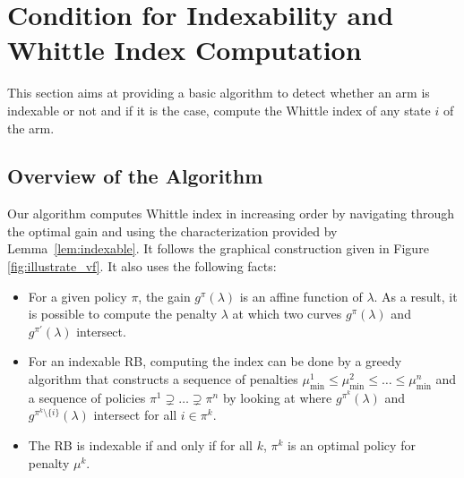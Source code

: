 \documentclass[acmsmall,screen,anonymous]{acmart}
\begin{document}
\section{Condition for Indexability and Whittle Index Computation}
\label{sec:widx_compute}

This section aims at providing a basic algorithm to detect whether an arm is indexable or not and if it is the case, compute the Whittle index of any state $i$ of the arm.

\subsection{Overview of the Algorithm}
\label{ssec:informal_widx_algo}

Our algorithm computes Whittle index in increasing order by navigating through the optimal gain and using the characterization provided by Lemma~\ref{lem:indexable}. It follows the graphical construction given in Figure \ref{fig:illustrate_vf}. It also uses the following facts:
\begin{itemize}
    \item For a given policy $\pi$, the gain $g^\pi(\lambda)$ is an affine function of $\lambda$. As a result, it is possible to compute the penalty $\lambda$ at which two curves $g^{\pi}(\lambda)$  and $g^{\pi'}(\lambda)$ intersect.
    \item For an indexable RB, computing the index can be done by a greedy algorithm that constructs a sequence of penalties $\mu^1_{\min}\le\mu^2_{\min}\le\dots\le\mu^n_{\min}$ and a sequence of policies $\pi^1\supsetneq\dots\supsetneq\pi^n$ by looking at where $g^{\pi^k}(\lambda)$ and $g^{\pi^k\setminus\{i\}}(\lambda)$ intersect for all $i\in\pi^k$.
    \item The RB is indexable if and only if for all $k$, $\pi^k$ is an optimal policy for penalty $\mu^k$. 
\end{itemize}
\end{document}
